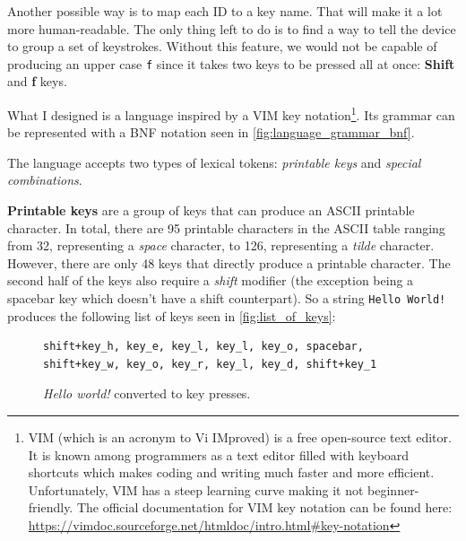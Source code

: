 Another possible way is to map each ID to a key name. That will make it a lot more human-readable. The only thing left to do is to find a way to tell the device to group a set of keystrokes. Without this feature, we would not be capable of producing an upper case \verb|f| since it takes two keys to be pressed all at once: \textbf{Shift} and \textbf{f} keys.

What I designed is a language inspired by a VIM key notation\footnote{VIM (which is an acronym to Vi IMproved) is a free open-source text editor. It is known among programmers as a text editor filled with keyboard shortcuts which makes coding and writing much faster and more efficient. Unfortunately, VIM has a steep learning curve making it not beginner-friendly. The official documentation for VIM key notation can be found here: \url{https://vimdoc.sourceforge.net/htmldoc/intro.html\#key-notation}}. Its grammar can be represented with a BNF notation seen in \autoref{fig:language_grammar_bnf}.

The language accepts two types of lexical tokens: \emph{printable keys} and \emph{special combinations}.

\textbf{Printable keys} are a group of keys that can produce an ASCII printable character. In total, there are 95 printable characters in the ASCII table ranging from 32, representing a \emph{space} character, to 126, representing a \emph{tilde} character. However, there are only 48 keys that directly produce a printable character. The second half of the keys also require a \emph{shift} modifier (the exception being a spacebar key which doesn't have a shift counterpart). So a string \verb|Hello World!| produces the following list of keys seen in \autoref{fig:list_of_keys}:

\begin{figure}[ht]
\centering
\begin{varwidth}{\linewidth}
\begin{verbatim}
shift+key_h, key_e, key_l, key_l, key_o, spacebar,
shift+key_w, key_o, key_r, key_l, key_d, shift+key_1
\end{verbatim}
\end{varwidth}
\caption{\emph{Hello world!} converted to key presses.}
\label{fig:list_of_keys}
\end{figure}

